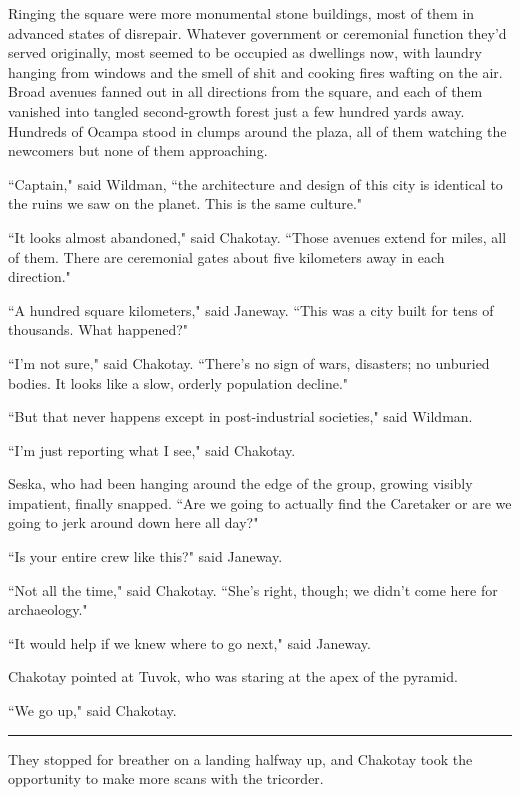 \documentclass[twoside,letterpaper,12pt]{memoir}
\begin{document}
Ringing the square were more monumental stone buildings, most of them in advanced states of disrepair. Whatever government or ceremonial function they'd served originally, most seemed to be occupied as dwellings now, with laundry hanging from windows and the smell of shit and cooking fires wafting on the air. Broad avenues fanned out in all directions from the square, and each of them vanished into tangled second-growth forest just a few hundred yards away. Hundreds of Ocampa stood in clumps around the plaza, all of them watching the newcomers but none of them approaching. 

``Captain," said Wildman, ``the architecture and design of this city is identical to the ruins we saw on the planet. This is the same culture." 

``It looks almost abandoned," said Chakotay. ``Those avenues extend for miles, all of them. There are ceremonial gates about five kilometers away in each direction." 

``A hundred square kilometers," said Janeway. ``This was a city built for tens of thousands. What happened?" 

``I'm not sure," said Chakotay. ``There's no sign of wars, disasters; no unburied bodies. It looks like a slow, orderly population decline." 

``But that never happens except in post-industrial societies," said Wildman. 

``I'm just reporting what I see," said Chakotay. 

Seska, who had been hanging around the edge of the group, growing visibly impatient, finally snapped. ``Are we going to actually find the Caretaker or are we going to jerk around down here all day?" 

``Is your entire crew like this?" said Janeway. 

``Not all the time," said Chakotay. ``She's right, though; we didn't come here for archaeology." 

``It would help if we knew where to go next," said Janeway. 

Chakotay pointed at Tuvok, who was staring at the apex of the pyramid. 

``We go up," said Chakotay. 

\begin{center}\rule{3cm}{0.4 pt}\end{center} 

They stopped for breather on a landing halfway up, and Chakotay took the opportunity to make more scans with the tricorder. 
\end{document}
